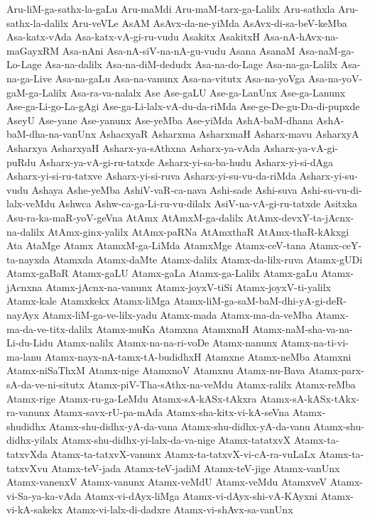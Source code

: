 {Aru-liM-ga-sathx-la-gaLu
Aru-maMdi
Aru-maM-tarx-ga-Lalilx
Aru-sathxla
Aru-sathx-la-dalilx
Aru-veVLe
AsAM
AsAvx-da-ne-yiMda
AsAvx-di-sa-beV-keMba
Asa-katx-vAda
Asa-katx-vA-gi-ru-vudu
Asakitx
AsakitxH
Asa-nA-hAvx-na-maGayxRM
Asa-nAni
Asa-nA-siV-na-nA-gu-vudu
Asana
AsanaM
Asa-naM-ga-Lo-Lage
Asa-na-dalilx
Asa-na-diM-dedudx
Asa-na-do-Lage
Asa-na-ga-Lalilx
Asa-na-ga-Live
Asa-na-gaLu
Asa-na-vanunx
Asa-na-vitutx
Asa-na-yoVga
Asa-na-yoV-gaM-ga-Lalilx
Asa-ra-va-nalalx
Ase
Ase-gaLU
Ase-ga-LanUnx
Ase-ga-Lanunx
Ase-ga-Li-go-La-gAgi
Ase-ga-Li-lalx-vA-du-da-riMda
Ase-ge-De-gu-Da-di-pupxde
AseyU
Ase-yane
Ase-yanunx
Ase-yeMba
Ase-yiMda
AshA-baM-dhana
AshA-baM-dha-na-vanUnx
AshacxyaR
Asharxma
AsharxmaH
Asharx-mavu
AsharxyA
Asharxya
AsharxyaH
Asharx-ya-sAthxna
Asharx-ya-vAda
Asharx-ya-vA-gi-puRdu
Asharx-ya-vA-gi-ru-tatxde
Asharx-yi-sa-ba-hudu
Asharx-yi-si-dAga
Asharx-yi-si-ru-tatxve
Asharx-yi-si-ruva
Asharx-yi-su-vu-da-riMda
Asharx-yi-su-vudu
Ashaya
Ashe-yeMba
AshiV-vaR-ca-nava
Ashi-sade
Ashi-suva
Ashi-su-vu-di-lalx-veMdu
Ashwca
Ashw-ca-ga-Li-ru-vu-dilalx
AsiV-na-vA-gi-ru-tatxde
Asitxka
Asu-ra-ka-maR-yoV-geVna
AtAmx
AtAmxM-ga-dalilx
AtAmx-devxY-ta-jAcnx-na-dalilx
AtAmx-ginx-yalilx
AtAmx-paRNa
AtAmxthaR
AtAmx-thaR-kAkxgi
Ata
AtaMge
Atamx
AtamxM-ga-LiMda
AtamxMge
Atamx-ceV-tana
Atamx-ceY-ta-nayxda
Atamxda
Atamx-daMte
Atamx-dalilx
Atamx-da-lilx-ruva
Atamx-gUDi
Atamx-gaBaR
Atamx-gaLU
Atamx-gaLa
Atamx-ga-Lalilx
Atamx-gaLu
Atamx-jAcnxna
Atamx-jAcnx-na-vanunx
Atamx-joyxV-tiSi
Atamx-joyxV-ti-yalilx
Atamx-kale
Atamxkekx
Atamx-liMga
Atamx-liM-ga-saM-baM-dhi-yA-gi-deR-nayAyx
Atamx-liM-ga-ve-lilx-yadu
Atamx-mada
Atamx-ma-da-veMba
Atamx-ma-da-ve-titx-dalilx
Atamx-muKa
Atamxna
AtamxnaH
Atamx-naM-sha-va-na-Li-du-Lidu
Atamx-nalilx
Atamx-na-na-ri-voDe
Atamx-nanunx
Atamx-na-ti-vi-ma-lanu
Atamx-nayx-nA-tamx-tA-budidhxH
Atamxne
Atamx-neMba
Atamxni
Atamx-niSaThxM
Atamx-nige
AtamxnoV
Atamxnu
Atamx-nu-Bava
Atamx-parx-sA-da-ve-ni-situtx
Atamx-piV-Tha-sAthx-na-veMdu
Atamx-ralilx
Atamx-reMba
Atamx-rige
Atamx-ru-ga-LeMdu
Atamx-sA-kASx-tAkxra
Atamx-sA-kASx-tAkx-ra-vanunx
Atamx-savx-rU-pa-mAda
Atamx-sha-kitx-vi-kA-seVna
Atamx-shudidhx
Atamx-shu-didhx-yA-da-vana
Atamx-shu-didhx-yA-da-vanu
Atamx-shu-didhx-yilalx
Atamx-shu-didhx-yi-lalx-da-va-nige
Atamx-tatatxvX
Atamx-ta-tatxvXda
Atamx-ta-tatxvX-vanunx
Atamx-ta-tatxvX-vi-cA-ra-vuLaLx
Atamx-ta-tatxvXvu
Atamx-teV-jada
Atamx-teV-jadiM
Atamx-teV-jige
Atamx-vanUnx
Atamx-vanenxV
Atamx-vanunx
Atamx-veMdU
Atamx-veMdu
AtamxveV
Atamx-vi-Sa-ya-ka-vAda
Atamx-vi-dAyx-liMga
Atamx-vi-dAyx-shi-vA-KAyxni
Atamx-vi-kA-sakekx
Atamx-vi-lalx-di-dadxre
Atamx-vi-shAvx-sa-vanUnx
}
